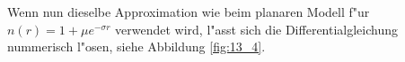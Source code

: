 Wenn nun dieselbe Approximation wie beim planaren Modell f"ur $n(r)=1 + \mu e^{-\sigma r}$
verwendet wird, l"asst sich die Differentialgleichung nummerisch l"osen, siehe Abbildung
\ref{fig:13_4}.

%   
%       
